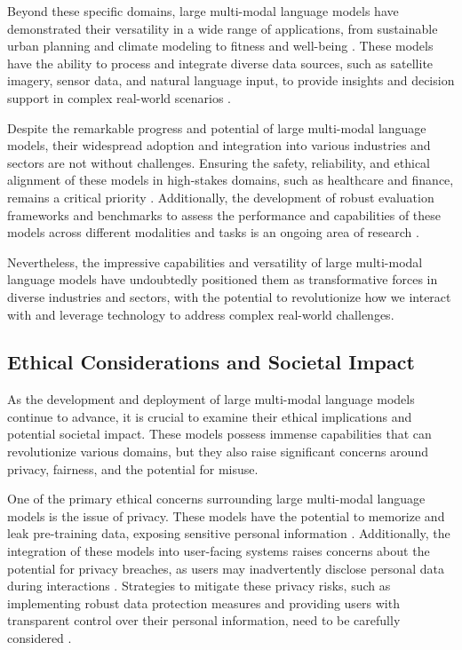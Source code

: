 \documentclass[11pt]{article}
\begin{document}
Beyond these specific domains, large multi-modal language models have demonstrated their versatility in a wide range of applications, from sustainable urban planning and climate modeling to fitness and well-being \cite{ref75}. These models have the ability to process and integrate diverse data sources, such as satellite imagery, sensor data, and natural language input, to provide insights and decision support in complex real-world scenarios \cite{ref76}.

Despite the remarkable progress and potential of large multi-modal language models, their widespread adoption and integration into various industries and sectors are not without challenges. Ensuring the safety, reliability, and ethical alignment of these models in high-stakes domains, such as healthcare and finance, remains a critical priority \cite{ref71,ref77}. Additionally, the development of robust evaluation frameworks and benchmarks to assess the performance and capabilities of these models across different modalities and tasks is an ongoing area of research \cite{ref78,ref29}.

Nevertheless, the impressive capabilities and versatility of large multi-modal language models have undoubtedly positioned them as transformative forces in diverse industries and sectors, with the potential to revolutionize how we interact with and leverage technology to address complex real-world challenges.

\subsection{Ethical Considerations and Societal Impact}

As the development and deployment of large multi-modal language models continue to advance, it is crucial to examine their ethical implications and potential societal impact. These models possess immense capabilities that can revolutionize various domains, but they also raise significant concerns around privacy, fairness, and the potential for misuse.

One of the primary ethical concerns surrounding large multi-modal language models is the issue of privacy. These models have the potential to memorize and leak pre-training data, exposing sensitive personal information \cite{ref79}. Additionally, the integration of these models into user-facing systems raises concerns about the potential for privacy breaches, as users may inadvertently disclose personal data during interactions \cite{ref80}. Strategies to mitigate these privacy risks, such as implementing robust data protection measures and providing users with transparent control over their personal information, need to be carefully considered \cite{ref81}.
\end{document}
